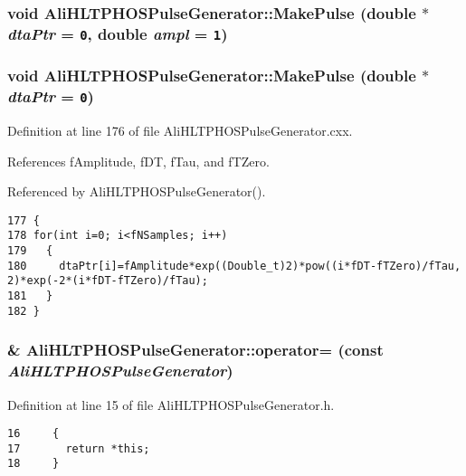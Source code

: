 \subsubsection{\setlength{\rightskip}{0pt plus 5cm}void Ali\-HLTPHOSPulse\-Generator::Make\-Pulse (double $\ast$ {\em dta\-Ptr} = {\tt 0}, double {\em ampl} = {\tt 1})\hspace{0.3cm}{\tt  [private]}}\label{classAliHLTPHOSPulseGenerator_d1}


\subsubsection{\setlength{\rightskip}{0pt plus 5cm}void Ali\-HLTPHOSPulse\-Generator::Make\-Pulse (double $\ast$ {\em dta\-Ptr} = {\tt 0})\hspace{0.3cm}{\tt  [private]}}\label{classAliHLTPHOSPulseGenerator_d0}




Definition at line 176 of file Ali\-HLTPHOSPulse\-Generator.cxx.

References f\-Amplitude, f\-DT, f\-Tau, and f\-TZero.

Referenced by Ali\-HLTPHOSPulse\-Generator().

\footnotesize\begin{verbatim}177 {
178 for(int i=0; i<fNSamples; i++)
179   {
180     dtaPtr[i]=fAmplitude*exp((Double_t)2)*pow((i*fDT-fTZero)/fTau, 2)*exp(-2*(i*fDT-fTZero)/fTau);
181   }  
182 }
\end{verbatim}\normalsize 


\subsubsection{\& Ali\-HLTPHOSPulse\-Generator::operator= (const  {\em Ali\-HLTPHOSPulse\-Generator})\hspace{0.3cm}{\tt  [inline]}}\label{classAliHLTPHOSPulseGenerator_a4}




Definition at line 15 of file Ali\-HLTPHOSPulse\-Generator.h.

\footnotesize\begin{verbatim}16     {
17       return *this; 
18     }
\end{verbatim}\normalsize 


